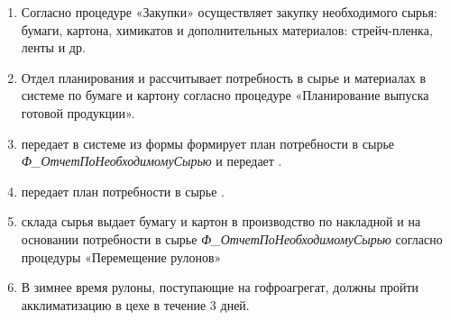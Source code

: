\begin{enumerate}


\item	Согласно процедуре «Закупки» \planner осуществляет закупку необходимого сырья: бумаги, картона, химикатов и дополнительных материалов: стрейч-пленка, ленты и др.
\item	Отдел планирования  и \planner рассчитывает потребность в сырье и материалах в системе \gofro по бумаге и картону согласно процедуре «Планирование выпуска готовой продукции».
\item	\planner передает в системе \gofro из формы  формирует план потребности в сырье \textit{Ф\_ОтчетПоНеобходимомуСырью} и передает \master.
\item	\master передает план потребности в сырье \kladovshik.
\item	\kladovshik склада сырья выдает бумагу и картон в производство по накладной и на основании потребности в сырье \textit{Ф\_ОтчетПоНеобходимомуСырью} согласно процедуры «Перемещение рулонов»
\item	В зимнее время рулоны, поступающие на гофроагрегат, должны пройти акклиматизацию в цехе в течение 3 дней.





\end{enumerate}




